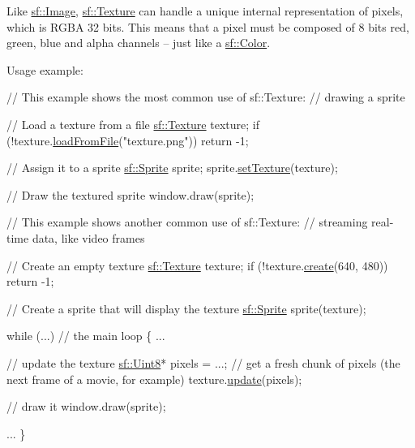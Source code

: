 Like \hyperlink{classsf_1_1_image}{sf\-::\-Image}, \hyperlink{classsf_1_1_texture}{sf\-::\-Texture} can handle a unique internal representation of pixels, which is R\-G\-B\-A 32 bits. This means that a pixel must be composed of 8 bits red, green, blue and alpha channels -- just like a \hyperlink{classsf_1_1_color}{sf\-::\-Color}.

Usage example\-: 
\begin{DoxyCode}
\textcolor{comment}{// This example shows the most common use of sf::Texture:}
\textcolor{comment}{// drawing a sprite}

\textcolor{comment}{// Load a texture from a file}
\hyperlink{classsf_1_1_texture}{sf::Texture} texture;
\textcolor{keywordflow}{if} (!texture.\hyperlink{classsf_1_1_texture_a8e1b56eabfe33e2e0e1cb03712c7fcc7}{loadFromFile}(\textcolor{stringliteral}{"texture.png"}))
    \textcolor{keywordflow}{return} -1;

\textcolor{comment}{// Assign it to a sprite}
\hyperlink{classsf_1_1_sprite}{sf::Sprite} sprite;
sprite.\hyperlink{classsf_1_1_sprite_a3729c88d88ac38c19317c18e87242560}{setTexture}(texture);

\textcolor{comment}{// Draw the textured sprite}
window.draw(sprite);
\end{DoxyCode}



\begin{DoxyCode}
\textcolor{comment}{// This example shows another common use of sf::Texture:}
\textcolor{comment}{// streaming real-time data, like video frames}

\textcolor{comment}{// Create an empty texture}
\hyperlink{classsf_1_1_texture}{sf::Texture} texture;
\textcolor{keywordflow}{if} (!texture.\hyperlink{classsf_1_1_texture_a89b4c7d204acf1033c3a1b6e0a3ad0a3}{create}(640, 480))
    \textcolor{keywordflow}{return} -1;

\textcolor{comment}{// Create a sprite that will display the texture}
\hyperlink{classsf_1_1_sprite}{sf::Sprite} sprite(texture);

\textcolor{keywordflow}{while} (...) \textcolor{comment}{// the main loop}
\{
    ...

    \textcolor{comment}{// update the texture}
    \hyperlink{namespacesf_a4ef3d630785c4f296f9b4f274c33d78e}{sf::Uint8}* pixels = ...; \textcolor{comment}{// get a fresh chunk of pixels (the next frame of a movie, for
       example)}
    texture.\hyperlink{classsf_1_1_texture_ae4eab5c6781316840b0c50ad08370963}{update}(pixels);

    \textcolor{comment}{// draw it}
    window.draw(sprite);

    ...
\}
\end{DoxyCode}


